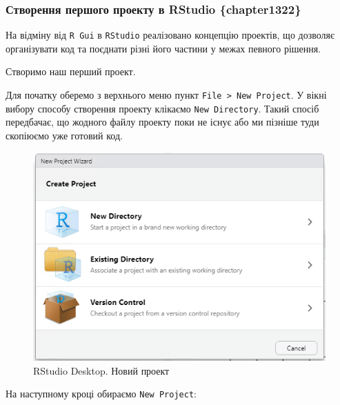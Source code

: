 \documentclass[
]{book}
\begin{document}
\hypertarget{ux441ux442ux432ux43eux440ux435ux43dux43dux44f-ux43fux435ux440ux448ux43eux433ux43e-ux43fux440ux43eux435ux43aux442ux443-ux432-rstudio-chapter1322}{%
\subsubsection{Створення першого проекту в RStudio \{chapter1322\}}\label{ux441ux442ux432ux43eux440ux435ux43dux43dux44f-ux43fux435ux440ux448ux43eux433ux43e-ux43fux440ux43eux435ux43aux442ux443-ux432-rstudio-chapter1322}}

На відміну від \texttt{R\ Gui} в \texttt{RStudio} реалізовано концепцію проектів, що дозволяє організувати код та поєднати різні його частини у межах певного рішення.

Створимо наш перший проект.

Для початку оберемо з верхнього меню пункт \texttt{File\ \textgreater{}\ New\ Project}. У вікні вибору способу створення проекту клікаємо \texttt{New\ Directory}. Такий спосіб передбачає, що жодного файлу проекту поки не існує або ми пізніше туди скопіюємо уже готовий код.

\begin{figure}
\includegraphics[width=7.53in]{images/chapter1/rstudio_6} \caption{RStudio Desktop. Новий проект}\label{fig:unnamed-chunk-17}
\end{figure}

На наступному кроці обираємо \texttt{New\ Project}:
\end{document}
